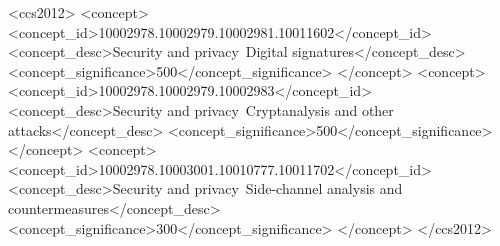 \documentclass[sigconf, nonacm=true]{acmart}
\begin{document}
\begin{CCSXML}
<ccs2012>
   <concept>
       <concept_id>10002978.10002979.10002981.10011602</concept_id>
       <concept_desc>Security and privacy~Digital signatures</concept_desc>
       <concept_significance>500</concept_significance>
       </concept>
   <concept>
       <concept_id>10002978.10002979.10002983</concept_id>
       <concept_desc>Security and privacy~Cryptanalysis and other attacks</concept_desc>
       <concept_significance>500</concept_significance>
       </concept>
   <concept>
       <concept_id>10002978.10003001.10010777.10011702</concept_id>
       <concept_desc>Security and privacy~Side-channel analysis and countermeasures</concept_desc>
       <concept_significance>300</concept_significance>
       </concept>
 </ccs2012>
\end{CCSXML}







\maketitle
%
%
%






%



\end{document}
